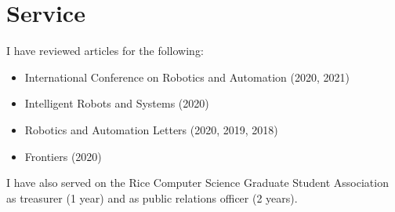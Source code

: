 \section{Service}

I have reviewed articles for the following:
\vspace{6pt}
\begin{itemize}

\item[] International Conference on Robotics and Automation (2020, 2021)
\vspace{6pt}
\item[] Intelligent Robots and Systems (2020)
\vspace{6pt}
\item[] Robotics and Automation Letters (2020, 2019, 2018)
\vspace{6pt}
\item[] Frontiers (2020)

\end{itemize}

\vspace{1em}
I have also served on the Rice Computer Science Graduate Student Association as treasurer (1 year) and as public relations officer (2 years).